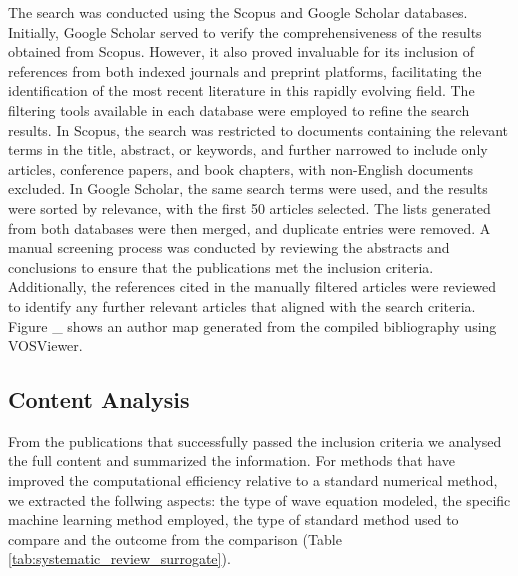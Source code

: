 \documentclass[11pt,twoside]{article}
\begin{document}
The search was conducted using the Scopus and Google Scholar databases. Initially, Google 
Scholar served to verify the comprehensiveness of the results obtained from Scopus. 
However, it also proved invaluable for its inclusion of references from both indexed 
journals and preprint platforms, facilitating the identification of the most recent literature 
in this rapidly evolving field. The filtering tools available in each database were employed 
to refine the search results. In Scopus, the search was restricted to documents containing 
the relevant terms in the title, abstract, or keywords, and further narrowed to include only 
articles, conference papers, and book chapters, with non-English documents excluded. In 
Google Scholar, the same search terms were used, and the results were sorted by relevance, 
with the first 50 articles selected. The lists generated from both databases were then merged, 
and duplicate entries were removed. A manual screening process was conducted by reviewing the 
abstracts and conclusions to ensure that the publications met the inclusion criteria. 
Additionally, the references cited in the manually filtered articles were reviewed to identify 
any further relevant articles that aligned with the search criteria. Figure \_ shows an author 
map generated from the compiled bibliography using VOSViewer. 

\subsection*{Content Analysis}

From the publications that successfully passed the inclusion criteria
we analysed the full content and summarized the information. For methods that have improved the 
computational efficiency relative to a standard numerical method, we extracted the follwing aspects: 
the type of wave equation modeled, the specific machine learning method employed, the type of standard method 
used to compare and the outcome from the comparison (Table \ref{tab:systematic_review_surrogate}).
\end{document}
